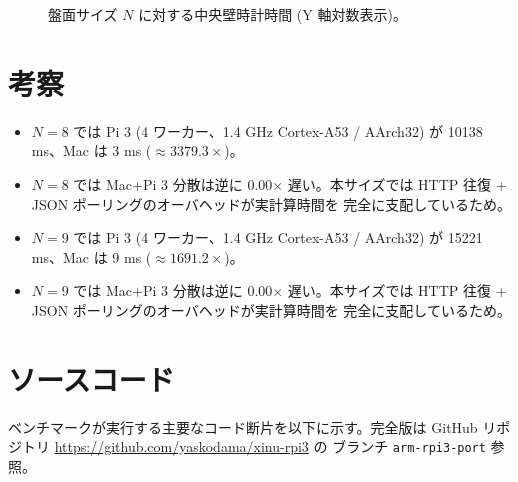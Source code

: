 \documentclass[a4paper,11pt]{ltjsarticle}
\begin{document}
\begin{figure}[h]
\centering
{}
\caption{盤面サイズ $N$ に対する中央壁時計時間 (Y 軸対数表示)。}
\label{fig:results}
\end{figure}

\section{考察}

\begin{itemize}
  \item $N=8$ では Pi 3 (4 ワーカー、1.4 GHz Cortex-A53 / AArch32) が 10138 ms、Mac は 3 ms ($\approx 3379.3\times$)。
  \item $N=8$ では Mac+Pi 3 分散は逆に 0.00$\times$ 遅い。本サイズでは HTTP 往復 + JSON ポーリングのオーバヘッドが実計算時間を 完全に支配しているため。
  \item $N=9$ では Pi 3 (4 ワーカー、1.4 GHz Cortex-A53 / AArch32) が 15221 ms、Mac は 9 ms ($\approx 1691.2\times$)。
  \item $N=9$ では Mac+Pi 3 分散は逆に 0.00$\times$ 遅い。本サイズでは HTTP 往復 + JSON ポーリングのオーバヘッドが実計算時間を 完全に支配しているため。
\end{itemize}

\section{ソースコード}

ベンチマークが実行する主要なコード断片を以下に示す。完全版は
GitHub リポジトリ \url{https://github.com/yaskodama/xinu-rpi3} の
ブランチ \texttt{arm-rpi3-port} 参照。
\end{document}
